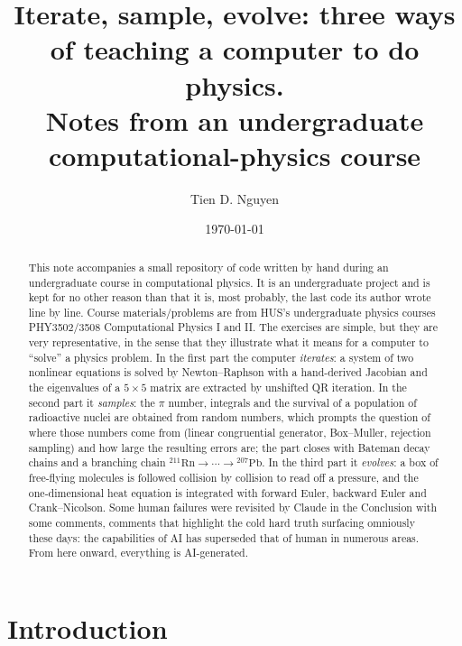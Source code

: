 \documentclass[aps,pra,twocolumn,superscriptaddress,floatfix,nofootinbib]{revtex4-2}
\begin{document}
\title{Iterate, sample, evolve: three ways of teaching a computer to do physics.\\
Notes from an undergraduate computational-physics course}

\author{Tien D. Nguyen}

\date{\today}

\begin{abstract}
This note accompanies a small repository of code written by hand during an undergraduate course in computational physics. It is an undergraduate project and is kept for no other reason than that it is, most probably, the last code its author wrote line by line. Course materials/problems are from HUS's undergraduate physics courses PHY3502/3508 Computational Physics I and II. The exercises are simple, but they are very representative, in the sense that they illustrate what it means for a computer to ``solve'' a physics problem. In the first part the computer \emph{iterates}: a system of two nonlinear equations is solved by Newton--Raphson with a hand-derived Jacobian and the eigenvalues of a $5\times5$ matrix are extracted by unshifted QR iteration. In the second part it \emph{samples}: the $\pi$ number, integrals and the survival of a population of radioactive nuclei are obtained from random numbers, which prompts the question of where those numbers come from (linear congruential generator, Box--Muller, rejection sampling) and how large the resulting errors are; the part closes with Bateman decay chains and a branching chain $^{211}\mathrm{Rn}\to\cdots\to{}^{207}\mathrm{Pb}$. In the third part it \emph{evolves}: a box of free-flying molecules is followed collision by collision to read off a pressure, and the one-dimensional heat equation is integrated with forward Euler, backward Euler and Crank--Nicolson. Some human failures were revisited by Claude in the Conclusion with some comments, comments that highlight the cold hard truth surfacing omniously these days: the capabilities of AI has superseded that of human in numerous areas. From here onward, everything is AI-generated.  
\end{abstract}

\maketitle

\section{Introduction}
\label{sec:intro}
\end{document}
